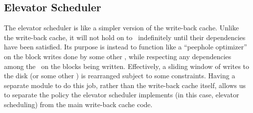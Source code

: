 \subsection{Elevator Scheduler}
\label{sec:modules:elevator}


The elevator scheduler is like a simpler version of the write-back cache. Unlike
the write-back cache, it will not hold on to \chdescs\ indefinitely until their
dependencies have been satisfied. Its purpose is instead to function like a
``peephole optimizer'' on the block writes done by some other \module, while
respecting any dependencies among the \chdescs\ on the blocks being written.
Effectively, a sliding window of writes to the disk (or some other \module) is
rearranged subject to some constraints. Having a separate module to do this job,
rather than the write-back cache itself, allows us to separate the policy the
elevator scheduler implements (in this case, elevator scheduling) from the main
write-back cache code.
